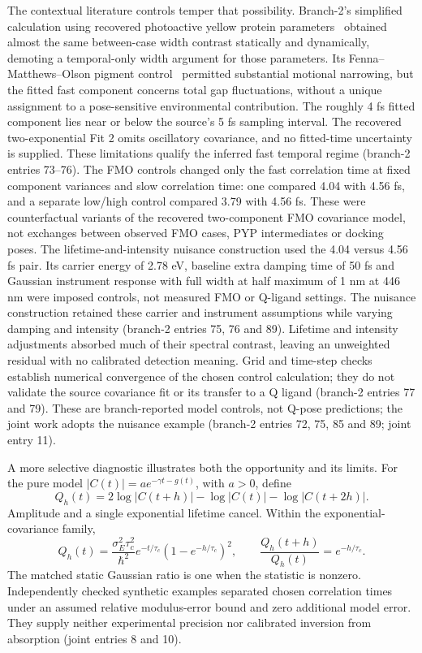 \documentclass{article}
\begin{document}
The contextual literature controls temper that possibility. Branch-2's simplified calculation using recovered photoactive yellow protein parameters~\cite{PYP} obtained almost the same between-case width contrast statically and dynamically, demoting a temporal-only width argument for those parameters. Its Fenna--Matthews--Olson pigment control~\cite{FMO} permitted substantial motional narrowing, but the fitted fast component concerns total gap fluctuations, without a unique assignment to a pose-sensitive environmental contribution. The roughly 4 fs fitted component lies near or below the source's 5 fs sampling interval. The recovered two-exponential Fit 2 omits oscillatory covariance, and no fitted-time uncertainty is supplied. These limitations qualify the inferred fast temporal regime (branch-2 entries 73--76). The FMO controls changed only the fast correlation time at fixed component variances and slow correlation time: one compared 4.04 with 4.56 fs, and a separate low/high control compared 3.79 with 4.56 fs. These were counterfactual variants of the recovered two-component FMO covariance model, not exchanges between observed FMO cases, PYP intermediates or docking poses. The lifetime-and-intensity nuisance construction used the 4.04 versus 4.56 fs pair. Its carrier energy of 2.78 eV, baseline extra damping time of 50 fs and Gaussian instrument response with full width at half maximum of 1 nm at 446 nm were imposed controls, not measured FMO or Q-ligand settings. The nuisance construction retained these carrier and instrument assumptions while varying damping and intensity (branch-2 entries 75, 76 and 89). Lifetime and intensity adjustments absorbed much of their spectral contrast, leaving an unweighted residual with no calibrated detection meaning. Grid and time-step checks establish numerical convergence of the chosen control calculation; they do not validate the source covariance fit or its transfer to a Q ligand (branch-2 entries 77 and 79). These are branch-reported model controls, not Q-pose predictions; the joint work adopts the nuisance example (branch-2 entries 72, 75, 85 and 89; joint entry 11).

A more selective diagnostic illustrates both the opportunity and its limits. For the pure model \(|C(t)|=a e^{-\gamma t-g(t)}\), with \(a>0\), define
\[
 Q_h(t)=2\log|C(t+h)|-\log|C(t)|-\log|C(t+2h)|.
\]
Amplitude and a single exponential lifetime cancel. Within the exponential-covariance family,
\[
 Q_h(t)=\frac{\sigma_E^2\tau_c^2}{\hbar^2}
 e^{-t/\tau_c}(1-e^{-h/\tau_c})^2,
 \qquad \frac{Q_h(t+h)}{Q_h(t)}=e^{-h/\tau_c}.
\]
The matched static Gaussian ratio is one when the statistic is nonzero. Independently checked synthetic examples separated chosen correlation times under an assumed relative modulus-error bound and zero additional model error. They supply neither experimental precision nor calibrated inversion from absorption (joint entries 8 and 10).
\end{document}
